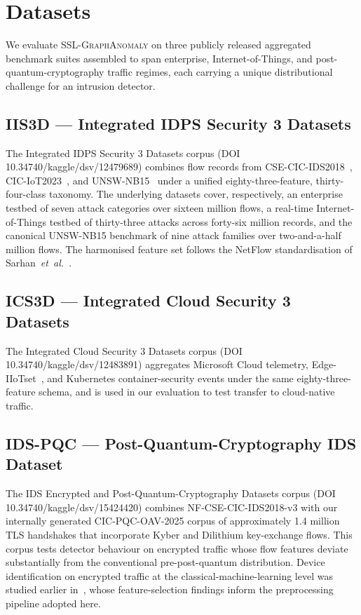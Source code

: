 \documentclass[journal,twoside]{IEEEtran}
\begin{document}
\section{Datasets}
\label{sec:datasets}
We evaluate \textsc{SSL-GraphAnomaly} on three publicly released
aggregated benchmark suites assembled to span enterprise, Internet-of-Things,
and post-quantum-cryptography traffic regimes, each carrying a unique
distributional challenge for an intrusion detector.

\subsection{IIS3D --- Integrated IDPS Security 3 Datasets}
The Integrated IDPS Security 3 Datasets corpus (DOI 10.34740/kaggle/dsv/12479689)
combines flow records from CSE-CIC-IDS2018~\cite{sharafaldin2018cicids},
CIC-IoT2023~\cite{neto2023ciciot}, and UNSW-NB15~\cite{moustafa2015unswnb15}
under a unified eighty-three-feature, thirty-four-class taxonomy. The
underlying datasets cover, respectively, an enterprise testbed of seven
attack categories over sixteen million flows, a real-time
Internet-of-Things testbed of thirty-three attacks across forty-six million
records, and the canonical UNSW-NB15 benchmark of nine attack families over
two-and-a-half million flows. The harmonised feature set follows the
NetFlow standardisation of Sarhan~\emph{et~al.}~\cite{sarhan2022standard}.

\subsection{ICS3D --- Integrated Cloud Security 3 Datasets}
The Integrated Cloud Security 3 Datasets corpus
(DOI 10.34740/kaggle/dsv/12483891) aggregates Microsoft Cloud telemetry,
Edge-IIoTset~\cite{ferrag2022edgeiiot}, and Kubernetes container-security
events under the same eighty-three-feature schema, and is used in our
evaluation to test transfer to cloud-native traffic.

\subsection{IDS-PQC --- Post-Quantum-Cryptography IDS Dataset}
The IDS Encrypted and Post-Quantum-Cryptography Datasets corpus
(DOI 10.34740/kaggle/dsv/15424420) combines NF-CSE-CIC-IDS2018-v3 with our
internally generated CIC-PQC-OAV-2025 corpus of approximately
1.4 million TLS handshakes that incorporate Kyber and Dilithium key-exchange
flows. This corpus tests detector behaviour on encrypted traffic whose
flow features deviate substantially from the conventional pre-post-quantum
distribution. Device identification on encrypted traffic at the classical-machine-learning
level was studied earlier in~\cite{anaedevha2024deviceid}, whose
feature-selection findings inform the preprocessing pipeline adopted here.
\end{document}
